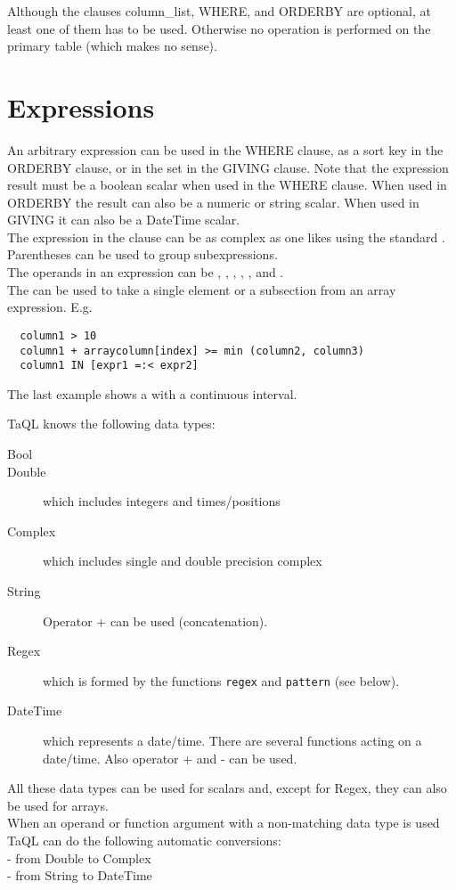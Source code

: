 Although the clauses column\_list, WHERE, and ORDERBY are optional,
at least one of them has to be used. Otherwise no operation is
performed on the primary table (which makes no sense).


\section{\label{TAQL:EXPRESSIONS}Expressions}
An arbitrary expression can be used in the WHERE clause, as a sort
key in the ORDERBY clause, or in the set in the GIVING clause.
Note that the expression result must be
a boolean scalar when used in the WHERE clause. When used in ORDERBY
the result can also be a numeric or string scalar. When used in 
GIVING it can also be a DateTime scalar.
\\The expression in the clause can be as complex as one likes
using the standard
.
Parentheses can be used to group subexpressions.
\\The operands in an expression can be
,
,
,
,
, and
.
\\The {} can be used to take a
single element or a subsection from an array expression.
E.g.
\begin{verbatim}
  column1 > 10
  column1 + arraycolumn[index] >= min (column2, column3)
  column1 IN [expr1 =:< expr2]
\end{verbatim}
The last example shows a  with a continuous interval.

\label{TAQL:DATATYPES}
TaQL knows the following data types:
\begin{description}
  \item[ Bool]
  \item[ Double] which includes integers and times/positions
  \item[ Complex ] which includes single and double precision complex
  \item[ String ] Operator + can be used (concatenation).
  \item[ Regex ] which is formed by the functions \texttt{regex}
    and \texttt{pattern} (see below).
  \item[ DateTime ] which represents a date/time. There are several functions
       acting on a date/time. Also operator + and - can be used.
\end{description}
All these data types can be used for scalars and, except for Regex,
they can also be used for arrays.
\\When an operand or function argument with a non-matching data type
is used TaQL can do the following automatic conversions:
\\- from Double to Complex
\\- from String to DateTime



